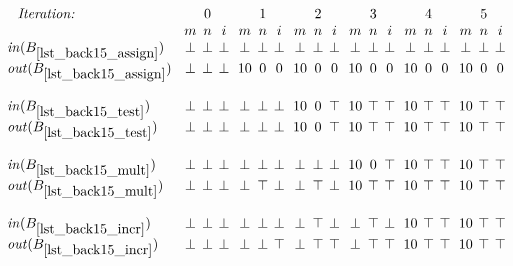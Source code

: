 \begin{math}
  \setlength{\arraycolsep}{2pt}
  \begin{array}{@{}l@{\phantom{X}}ccc@{\hskip0.6em}ccc@{\hskip0.6em}ccc@{\hskip0.6em}ccc@{\hskip0.6em}ccc@{\hskip0.6em}ccc@{}}
    \rlap{\hfil\phantom{X}\textit{Iteration:}} &
    & 0 & & 
    & 1 & & 
    & 2 & & 
    & 3 & &
    & 4 & &
    & 5 & \\ 

    & %
    m & n & i & %
    m & n & i & %
    m & n & i & %
    m & n & i & %
    m & n & i & %
    m & n & i \\ %

    \inB{lst_back15_assign} & %
    \bot & \bot & \bot & %
    \bot & \bot & \bot & %
    \bot & \bot & \bot & %
    \bot & \bot & \bot & %
    \bot & \bot & \bot & %
    \bot & \bot & \bot \\ %
    \outB{lst_back15_assign} & %
    \bot & \bot & \bot & %
    10 & 0 & 0 & %
    10 & 0 & 0 & %
    10 & 0 & 0 & %
    10 & 0 & 0 & %
    10 & 0 & 0 \\\\ %

    \inB{lst_back15_test} & %
    \bot & \bot & \bot & %
    \bot & \bot & \bot & %
    10 & 0 & \top & %
    10 & \top & \top & %
    10 & \top & \top & %
    10 & \top & \top\\ %
    \outB{lst_back15_test} & %
    \bot & \bot & \bot & %
    \bot & \bot & \bot & %
    10 & 0 & \top & %
    10 & \top & \top & %
    10 & \top & \top & %
    10 & \top & \top \\\\ %

    \inB{lst_back15_mult} & %
    \bot & \bot & \bot & %
    \bot & \bot & \bot & %
    \bot & \bot & \bot & %
    10 & 0 & \top & %
    10 & \top & \top & %
    10 & \top & \top \\ %
    \outB{lst_back15_mult} & %
    \bot & \bot & \bot & %
    \bot & \top & \bot & %
    \bot & \top & \bot & %
    10 & \top & \top & %
    10 & \top & \top & %
    10 & \top & \top \\\\ %

    \inB{lst_back15_incr} & %
    \bot & \bot & \bot & %
    \bot & \bot & \bot & %
    \bot & \top & \bot & %
    \bot & \top & \bot & %
    10 & \top & \top & %
    10 & \top & \top \\ %
    \outB{lst_back15_incr} & %
    \bot & \bot & \bot & %
    \bot & \bot & \top & %
    \bot & \top & \top & %
    \bot & \top & \top & %
    10 & \top & \top & %
    10 & \top & \top \\\\ %


\end{array}
\end{math}
